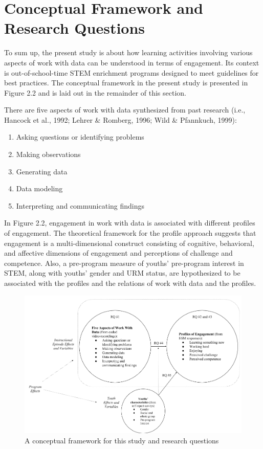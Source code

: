 \documentclass[]{msu-thesis}
\providecommand{\tightlist}{%
  \setlength{\itemsep}{0pt}\setlength{\parskip}{0pt}}
\theoremstyle{definition}
\theoremstyle{definition}
\theoremstyle{definition}
\theoremstyle{remark}
\begin{document}
\section{Conceptual Framework and Research
Questions}\label{conceptual-framework-and-research-questions}

To sum up, the present study is about how learning activities involving
various aspects of work with data can be understood in terms of
engagement. Its context is out-of-school-time STEM enrichment programs
designed to meet guidelines for best practices. The conceptual framework
in the present study is presented in Figure 2.2 and is laid out in the
remainder of this section.

There are five aspects of work with data synthesized from past research
(i.e., Hancock et al., 1992; Lehrer \& Romberg, 1996; Wild \& Pfannkuch,
1999):

\begin{enumerate}
\def\labelenumi{\arabic{enumi}.}
\tightlist
\item
  Asking questions or identifying problems
\item
  Making observations
\item
  Generating data
\item
  Data modeling
\item
  Interpreting and communicating findings
\end{enumerate}

In Figure 2.2, engagement in work with data is associated with different
profiles of engagement. The theoretical framework for the profile
approach suggests that engagement is a multi-dimensional construct
consisting of cognitive, behavioral, and affective dimensions of
engagement and perceptions of challenge and competence. Also, a
pre-program measure of youths' pre-program interest in STEM, along with
youths' gender and URM status, are hypothesized to be associated with
the profiles and the relations of work with data and the profiles.

\begin{figure}

{\centering \includegraphics[width=0.8\linewidth]{images/figure2} 

}

\caption{A conceptual framework for this study and research questions}\label{fig:unnamed-chunk-2}
\end{figure}
\end{document}
